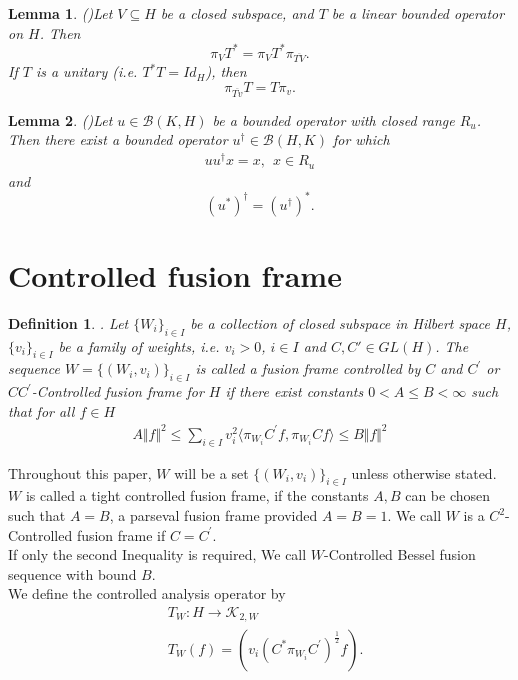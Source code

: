 \documentclass{mfatshort}
\newtheorem{lemma}{Lemma}
\newtheorem{definition}{Definition}
\begin{document}
\begin{lemma}(\cite{ga})\label{l1}
Let $V\subseteq H$ be a closed subspace, and $T$ be a linear  bounded operator on $H$. Then
$$\pi_{V}T^*=\pi_{V}T^* \pi_{\overline{TV}}.$$
If $T$ is a unitary (i.e. $T^*T=Id_{H}$), then
$$\pi_{\overline{Tv}}T=T\pi_{v}.$$
\end{lemma}
\begin{lemma}(\cite{ch})\label{l3}
Let $u \in \mathcal{B}(K,H)$ be a bounded operator with closed range $R_{u}$. Then there exist a bounded  operator $u^{\dagger} \in \mathcal{B}(H,K)$ for which\\
\begin{align*}
uu^{\dagger}x=x, \ \  x \in R_{u}
\end{align*}
and $$(u^*)^\dagger=(u^{\dagger})^*.$$
\end{lemma}
\section{Controlled fusion frame}
\begin{definition}.\cite{Khosravi}
Let $\lbrace W_{i}\rbrace_ {i\in I}$ be a collection of closed subspace in Hilbert space $H$,  $\lbrace v_{i}\rbrace_ {i\in I}$ be a family of weights, i.e. $v_{i}>0$,  $i \in I$ and $C, C'\in GL(H)$. The sequence  $W=\lbrace (W_{i},v_{i})\rbrace _ {i \in I}$ is called a fusion frame controlled by $C$ and $C^{\prime}$ or $CC^{\prime}$-Controlled fusion frame  for $H$ if there exist constants $0< A \leq B< \infty$ such that for all $f \in H$
\begin{align*}
A \Vert f \Vert^{2} \leq \sum _{i\in I} v_{i}^{2} \langle \pi_{W_{i}} C^{\prime}f,\pi_{W_{i}} Cf \rangle  \leq B \Vert f\Vert^{2}
\end{align*}
\end{definition}
Throughout this paper, $W$ will be a set $\lbrace (W_{i},v_{i})\rbrace _ {i \in I}$ unless otherwise stated.  $W$ is called a tight controlled fusion frame, if  the constants $A,B$ can be chosen such that  $A=B$, a parseval fusion frame provided $A=B=1$. We call $W$ is a $C^2$-Controlled fusion frame  if $C=C^{\prime}$.\\ 
If only the second Inequality is required, We call $W$-Controlled Bessel fusion sequence  with bound $B$.\\
We define the controlled analysis operator by\\
\begin{align*}
&T_{W}:H \rightarrow \mathcal{K}_{2,W} \\
&T_{W}(f)=(v_{i}(C^{*}\pi_{W_{i}}C^{\prime})^{\frac{1}{2}}f).
\end{align*}
\end{document}
